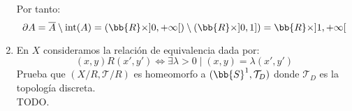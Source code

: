 \documentclass[12pt]{article}
\newcounter{ejercicio}[section] %
\newcounter{ejercicio}
\begin{document}
\begin{ejercicio}[4.5 puntos]
\begin{enumerate}[label=(\alph*)]
                \noindent
                Por tanto:
                $$\partial A = \overline{A}\setminus \mathrm{int}(A) = (\bb{R} \times ]0, +\infty[) \setminus (\bb{R} \times ]0, 1]) = \bb{R} \times ]1, +\infty[$$

            \item En $X$ consideramos la relación de equivalencia dada por:
                $$(x,y)R(x',y') \Leftrightarrow \exists \lambda > 0 \mid (x,y) = \lambda(x',y')$$
                Prueba que $(X/R, \mathcal{T}/R)$ es homeomorfo a $(\bb{S}^1, \mathcal{T}_D)$ donde $\mathcal{T}_D$ es la topología discreta.\\

                \noindent
                TODO.
        \end{enumerate}
    \end{ejercicio}
        
\end{document}
